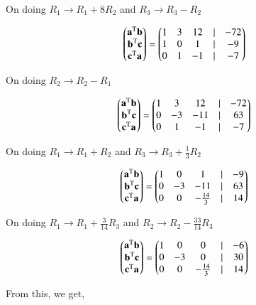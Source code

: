 \documentclass[journal]{IEEEtran}
\begin{document}
On doing $R_1\rightarrow R_1+8R_2$ and $R_3\rightarrow R_3-R_2$

\begin{align}
    \begin{pmatrix}\textbf{a}^\text{T}\textbf{b}\\\textbf{b}^\text{T}\textbf{c}\\\textbf{c}^\text{T}\textbf{a}\\\end{pmatrix}=\begin{pmatrix}1 & 3 & 12 &| & -72\\1& 0 & 1 & | &-9\\0&1&-1&|&-7\end{pmatrix}
    \label{0.11}
\end{align}

On doing $R_2\rightarrow R_2-R_1$

\begin{align}
    \begin{pmatrix}\textbf{a}^\text{T}\textbf{b}\\\textbf{b}^\text{T}\textbf{c}\\\textbf{c}^\text{T}\textbf{a}\\\end{pmatrix}=\begin{pmatrix}1 & 3 & 12 &| & -72\\0& -3 & -11 & | &63\\0&1&-1&|&-7\end{pmatrix}
    \label{0.12}
\end{align}

On doing $R_1 \rightarrow R_1 + R_2$ and $R_3 \rightarrow R_3+\frac{1}{3}R_2$

\begin{align}
    \begin{pmatrix}\textbf{a}^\text{T}\textbf{b}\\\textbf{b}^\text{T}\textbf{c}\\\textbf{c}^\text{T}\textbf{a}\\\end{pmatrix}=\begin{pmatrix}1 & 0 & 1 &| & -9\\0& -3 & -11 & | &63\\0&0&-\frac{14}{3}&|&14\end{pmatrix}
    \label{0.13}
\end{align}

On doing $R_1\rightarrow R_1+\frac{3}{14}R_3$ and $R_2\rightarrow R_2-\frac{33}{14}R_3$

\begin{align}
    \begin{pmatrix}\textbf{a}^\text{T}\textbf{b}\\\textbf{b}^\text{T}\textbf{c}\\\textbf{c}^\text{T}\textbf{a}\\\end{pmatrix}=\begin{pmatrix}1 & 0 & 0 &| & -6\\0& -3 & 0 & | &30\\0&0&-\frac{14}{3}&|&14\end{pmatrix}
    \label{0.14}
\end{align}

From this, we get,
\end{document}

